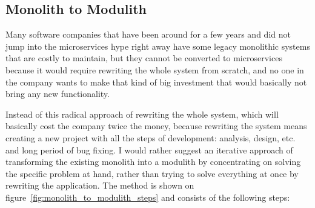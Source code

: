 \subsection{Monolith to Modulith}
\label{subsection:monolith_to_modulith}
Many software companies that have been around for a few years and did not jump into the microservices hype right away have some legacy monolithic systems that are costly to maintain, but they cannot be converted to microservices because it would require rewriting the whole system from scratch, and no one in the company wants to make that kind of big investment that would basically not bring any new functionality.

Instead of this radical approach of rewriting the whole system, which will basically cost the company twice the money, because rewriting the system means creating a new project with all the steps of development: analysis, design, etc. and long period of bug fixing. I would rather suggest an iterative approach of transforming the existing monolith into a modulith by concentrating on solving the specific problem at hand, rather than trying to solve everything at once by rewriting the application. The method is shown on figure~\ref{fig:monolith_to_modulith_steps} and consists of the following steps:

